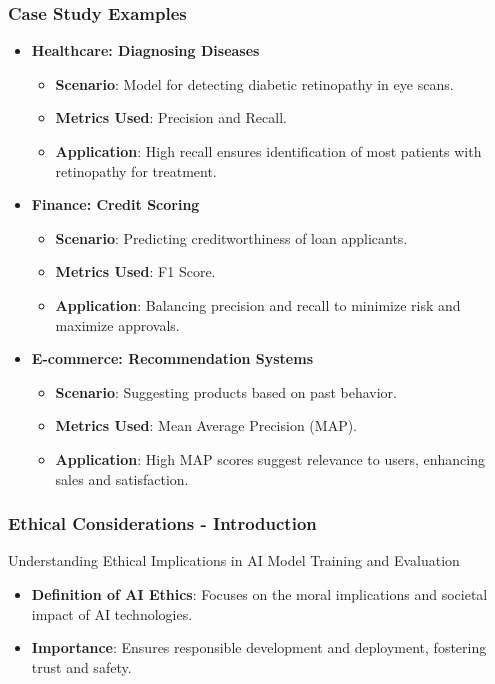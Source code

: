 \documentclass[aspectratio=169]{beamer}
\begin{document}
\begin{frame}[fragile]
    \frametitle{Case Study Examples}
    \begin{itemize}
        \item \textbf{Healthcare: Diagnosing Diseases}
        \begin{itemize}
            \item \textbf{Scenario}: Model for detecting diabetic retinopathy in eye scans.
            \item \textbf{Metrics Used}: Precision and Recall.
            \item \textbf{Application}: High recall ensures identification of most patients with retinopathy for treatment.
        \end{itemize}
        
        \item \textbf{Finance: Credit Scoring}
        \begin{itemize}
            \item \textbf{Scenario}: Predicting creditworthiness of loan applicants.
            \item \textbf{Metrics Used}: F1 Score.
            \item \textbf{Application}: Balancing precision and recall to minimize risk and maximize approvals.
        \end{itemize}
        
        \item \textbf{E-commerce: Recommendation Systems}
        \begin{itemize}
            \item \textbf{Scenario}: Suggesting products based on past behavior.
            \item \textbf{Metrics Used}: Mean Average Precision (MAP).
            \item \textbf{Application}: High MAP scores suggest relevance to users, enhancing sales and satisfaction.
        \end{itemize}
    \end{itemize}
\end{frame}

\begin{frame}[fragile]
    \frametitle{Ethical Considerations - Introduction}
    \begin{block}{Understanding Ethical Implications in AI Model Training and Evaluation}
        \begin{itemize}
            \item \textbf{Definition of AI Ethics}: Focuses on the moral implications and societal impact of AI technologies.
            \item \textbf{Importance}: Ensures responsible development and deployment, fostering trust and safety.
        \end{itemize}
    \end{block}
\end{frame}
\end{document}
